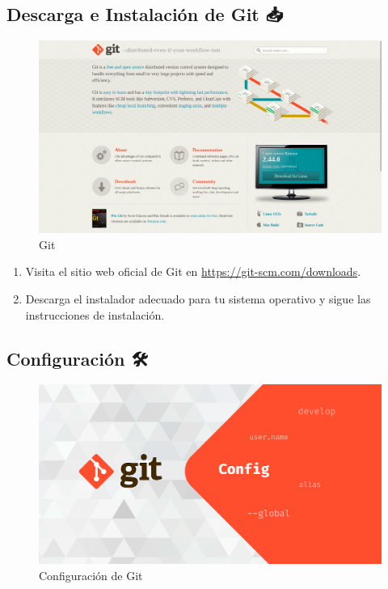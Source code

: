 \documentclass[
  a4paper,
  DIV=11,
  numbers=noendperiod,
  onepage,
  openany]{scrreprt}
\providecommand{\tightlist}{%
  \setlength{\itemsep}{0pt}\setlength{\parskip}{0pt}}\usepackage{longtable,booktabs,array}
\begin{document}
\subsection{Descarga e Instalación de Git
📥}\label{descarga-e-instalaciuxf3n-de-git}

\begin{figure}[H]

{\centering \includegraphics[width=6.25in,height=\textheight]{unidades/unidad1/../../images/website-git.png}

}

\caption{Git}

\end{figure}%

\begin{enumerate}
\def\labelenumi{\arabic{enumi}.}
\tightlist
\item
  Visita el sitio web oficial de Git en
  \url{https://git-scm.com/downloads}.
\item
  Descarga el instalador adecuado para tu sistema operativo y sigue las
  instrucciones de instalación.
\end{enumerate}

\subsection{Configuración 🛠️}\label{configuraciuxf3n}

\begin{figure}[H]

{\centering \includegraphics[width=6.25in,height=\textheight]{unidades/unidad1/../../images/git_config.png}

}

\caption{Configuración de Git}

\end{figure}%
\end{document}
